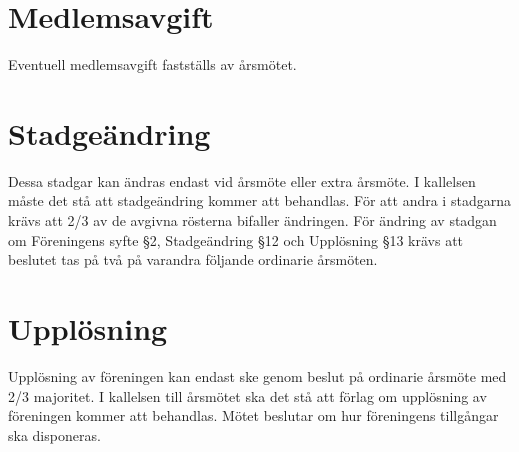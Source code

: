 \documentclass[a4paper,11pt,oneside]{article}
\begin{document}
\section{Medlemsavgift}
Eventuell medlemsavgift fastställs av årsmötet.

\section{Stadgeändring}
Dessa stadgar kan ändras endast vid årsmöte eller extra årsmöte. I kallelsen
måste det stå att stadgeändring kommer att behandlas. För att andra i stadgarna
krävs att 2/3 av de avgivna rösterna bifaller ändringen. För ändring av stadgan
om Föreningens syfte §2, Stadgeändring §12 och Upplösning §13 krävs att beslutet
tas på två på varandra följande ordinarie årsmöten.

\section{Upplösning}
Upplösning av föreningen kan endast ske genom beslut på ordinarie årsmöte med
2/3 majoritet. I kallelsen till årsmötet ska det stå att förlag om upplösning av
föreningen kommer att behandlas. Mötet beslutar om hur föreningens tillgångar
ska disponeras.
\end{document}
